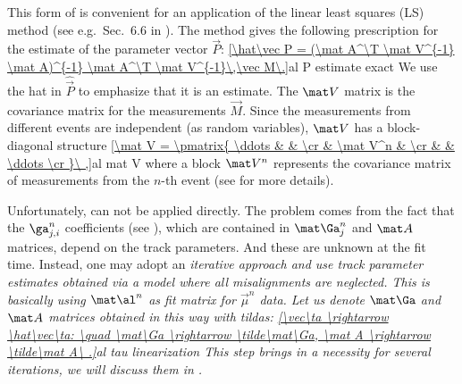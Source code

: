 This form of  is convenient for an application of the linear least squares (LS) method (see e.g.~Sec.~6.6 in ). The method gives the following prescription for the estimate of the parameter vector $\vec P$:
\eqref{\hat\vec P = (\mat A^\T \mat V^{-1} \mat A)^{-1} \mat A^\T \mat V^{-1}\,\vec M\.}{al P estimate exact}
We use the hat in $\hat\vec P$ to emphasize that it is an estimate. The $\mat V$ matrix is the covariance matrix for the measurements $\vec M$. Since the measurements from different events are independent (as random variables), $\mat V$ has a block-diagonal structure
\eqref{\mat V = \pmatrix{
\ddots	&			&			\cr
		& \mat V^n	&			\cr
		&			& \ddots	\cr
}\ ,}{al mat V}
where a block $\mat V^n$ represents the covariance matrix of measurements from the $n$-th event (see  for more details).

Unfortunately,  can not be applied directly. The problem comes from the fact that the $\ga^n_{j,i}$ coefficients (see ), which are contained in $\mat\Ga_j^n$ and $\mat A$ matrices, depend on the track parameters. And these are unknown at the fit time. Instead, one may adopt an \em{iterative} approach and use track parameter estimates obtained via a model where all misalignments are neglected. This is basically using $\mat \al^n$ as fit matrix for $\vec \mu^n$ data. Let us denote $\mat\Ga$ and $\mat A$ matrices obtained in this way with tildas:
\eqref{\vec\ta \rightarrow \hat\vec\ta: \quad \mat\Ga \rightarrow \tilde\mat\Ga, \mat A \rightarrow \tilde\mat A\ .}{al tau linearization}
This step brings in a necessity for several iterations, we will discuss them in .

